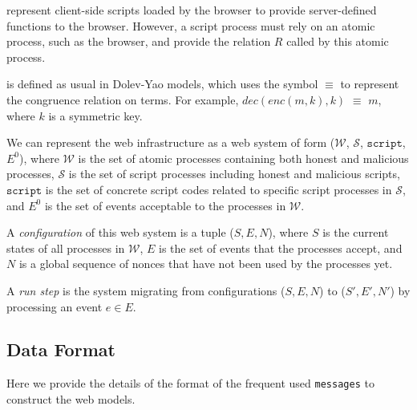 \vspace{1mm}
 represent client-side scripts loaded by the browser to provide server-defined functions to the browser. However, a script process must rely on an atomic process, such as the browser, and provide the relation $R$ called by this atomic process.

\vspace{1mm}
 is defined as usual in Dolev-Yao models, which uses the symbol $\equiv$ to represent the congruence relation on terms. For example, $dec(enc(m, k), k)$ $\equiv$ $m$, where $k$ is a symmetric key.

\vspace{1mm}
 We can represent the web infrastructure as a web system of form ($\mathcal{W}$, $\mathcal{S}$, $\mathtt{script}$, $E^0$), where $\mathcal{W}$ is the set of atomic processes containing both honest and malicious processes, $\mathcal{S}$ is the set of script processes including honest and malicious scripts, $\mathtt{script}$ is the set of concrete script codes related to specific script processes in $\mathcal{S}$, and $E^0$ is the set of events acceptable to the processes in $\mathcal{W}$.

\vspace{1mm}
\noindent A {\em configuration} of this web system is a tuple ($S, E, N$), where $S$ is the current states of all processes in $\mathcal{W}$, $E$ is the set of events that the processes accept, and $N$ is a global sequence of nonces that have not been used by the processes yet.


\vspace{1mm}
\noindent A {\em run step} is the system migrating from configurations ($S, E, N$) to ($S', E', N'$) by processing an event $e \in E$.


\subsection{Data Format}
Here we provide the details of the  format of the frequent used \verb+messages+ to construct the web models.

